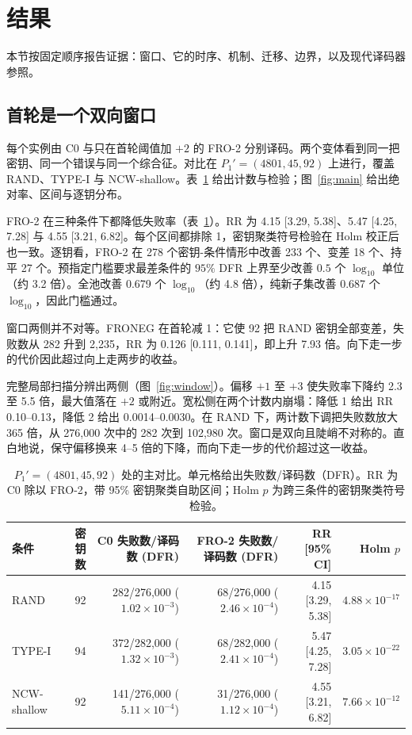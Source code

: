 \section{结果}\label{sec:results}

本节按固定顺序报告证据：窗口、它的时序、机制、迁移、边界，以及现代译码器参照。

\subsection{首轮是一个双向窗口}\label{sec:formal}

每个实例由 C0 与只在首轮阈值加 $+2$ 的 FRO-2 分别译码。两个变体看到同一把密钥、同一个错误与同一个综合征。对比在 $P_1'=(4801,45,92)$ 上进行，覆盖 RAND、TYPE-I 与 NCW-shallow。表~\ref{tab:main} 给出计数与检验；图~\ref{fig:main} 给出绝对率、区间与逐钥分布。

FRO-2 在三种条件下都降低失败率（表~\ref{tab:main}）。RR 为 4.15 [3.29, 5.38]、5.47 [4.25, 7.28] 与 4.55 [3.21, 6.82]。每个区间都排除 1，密钥聚类符号检验在 Holm 校正后也一致。逐钥看，FRO-2 在 278 个密钥-条件情形中改善 233 个、变差 18 个、持平 27 个。预指定门槛要求最差条件的 $95\%$ DFR 上界至少改善 $0.5$ 个 $\log_{10}$ 单位（约 3.2 倍）。全池改善 0.679 个 $\log_{10}$（约 4.8 倍），纯新子集改善 0.687 个 $\log_{10}$，因此门槛通过。

窗口两侧并不对等。FRONEG 在首轮减 1：它使 92 把 RAND 密钥全部变差，失败数从 282 升到 2{,}235，RR 为 0.126 [0.111, 0.141]，即上升 7.93 倍。向下走一步的代价因此超过向上走两步的收益。

完整局部扫描分辨出两侧（图~\ref{fig:window}）。偏移 $+1$ 至 $+3$ 使失败率下降约 2.3 至 5.5 倍，最大值落在 $+2$ 或附近。宽松侧在两个计数内崩塌：降低 1 给出 RR 0.10--0.13，降低 2 给出 0.0014--0.0030。在 RAND 下，两计数下调把失败数放大 365 倍，从 276{,}000 次中的 282 次到 102{,}980 次。窗口是双向且陡峭不对称的。直白地说，保守偏移换来 4--5 倍的下降，而向下走一步的代价超过这一收益。

\begin{table}[!t]
\centering
\small
\caption{$P_1'=(4801,45,92)$ 处的主对比。单元格给出失败数/译码数（DFR）。RR 为 C0 除以 FRO-2，带 95\% 密钥聚类自助区间；Holm $p$ 为跨三条件的密钥聚类符号检验。}
\label{tab:main}
\begin{tabular}{l r r r r r}
\toprule
条件 & 密钥数 & C0 失败数/译码数 (DFR) & FRO-2 失败数/译码数 (DFR) & RR [95\% CI] & Holm $p$ \\
\midrule
RAND & 92 & 282/276{,}000 ($1.02\times10^{-3}$) & 68/276{,}000 ($2.46\times10^{-4}$) & 4.15 [3.29, 5.38] & $4.88\times10^{-17}$ \\
TYPE-I & 94 & 372/282{,}000 ($1.32\times10^{-3}$) & 68/282{,}000 ($2.41\times10^{-4}$) & 5.47 [4.25, 7.28] & $3.05\times10^{-22}$ \\
NCW-shallow & 92 & 141/276{,}000 ($5.11\times10^{-4}$) & 31/276{,}000 ($1.12\times10^{-4}$) & 4.55 [3.21, 6.82] & $7.66\times10^{-12}$ \\
\bottomrule
\end{tabular}
\end{table}

